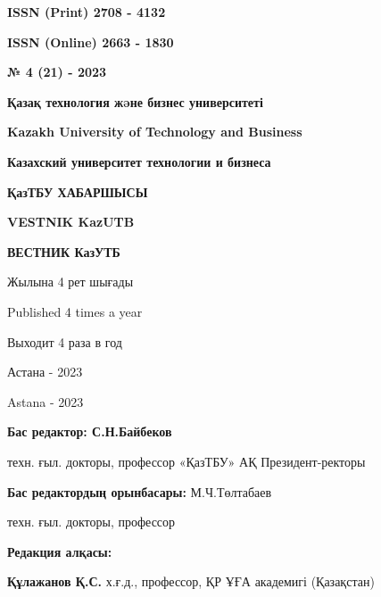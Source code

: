\begin{flushright}
\textbf{ISSN (Print) 2708 - 4132}

\textbf{ISSN (Online) 2663 - 1830}

\vspace{1cm}

\textbf{№ 4 (21) - 2023}
\end{flushright}

\vfill

\begin{center}
\textbf{\large Қазақ технология жəне бизнес университеті}

\vspace{0.3cm}

\textbf{\large Kazakh University of Technology and Business}

\vspace{0.3cm}

\textbf{\large Казахский университет технологии и бизнеса}

\vfill

\textbf{\huge ҚазТБУ ХАБАРШЫСЫ}

\vspace{0.5cm}

\textbf{\huge VESTNIK KazUTB}

\vspace{0.5cm}

\textbf{\huge ВЕСТНИК КазУТБ}

\vfill

Жылына 4 рет шығады

Published 4 times a year

Выходит 4 раза в год

\vfill

Астана - 2023

Astana - 2023
\end{center}

\pagebreak

\begin{center}
\textbf{Бас редактор: С.Н.Байбеков}

техн. ғыл. докторы, профессор «ҚазТБУ» АҚ Президент-ректоры

\textbf{Бас редактордың орынбасары:} М.Ч.Төлтабаев

техн. ғыл. докторы, профессор

\textbf{Редакция алқасы:}
\end{center}

\textbf{Құлажанов Қ.С.} х.ғ.д., профессор, ҚР ҰҒА академигі (Қазақстан)

